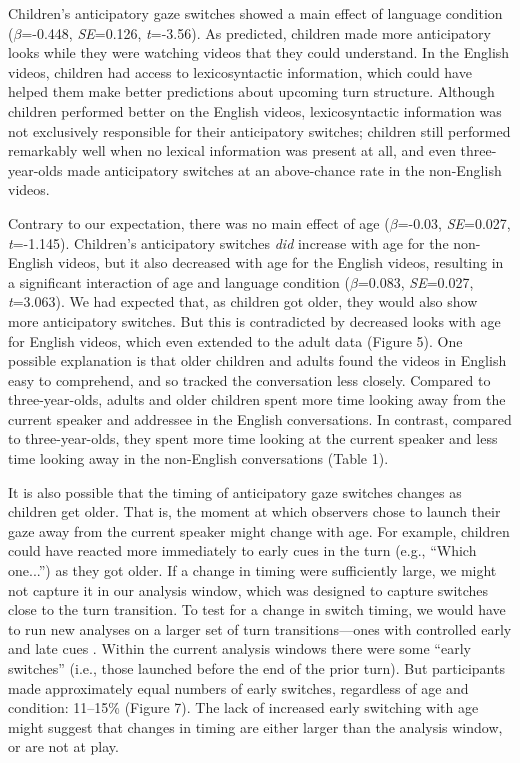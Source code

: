 \documentclass[authoryear, 12pt]{elsarticle}
\begin{document}
Children's anticipatory gaze switches showed a main effect of language condition (\textit{$\beta$}=-0.448, \textit{SE}=0.126, \textit{t}=-3.56). As predicted, children made more anticipatory looks while they were watching videos that they could understand. In the English videos, children had access to lexicosyntactic information, which could have helped them make better predictions about upcoming turn structure. Although children performed better on the English videos, lexicosyntactic information was not exclusively responsible for their anticipatory switches; children still performed remarkably well when no lexical information was present at all, and even three-year-olds made anticipatory switches at an above-chance rate in the non-English videos.

Contrary to our expectation, there was no main effect of age (\textit{$\beta$}=-0.03, \textit{SE}=0.027, \textit{t}=-1.145). Children's anticipatory switches \textit{did} increase with age for the non-English videos, but it also decreased with age for the English videos, resulting in a significant interaction of age and language condition (\textit{$\beta$}=0.083, \textit{SE}=0.027, \textit{t}=3.063). We had expected that, as children got older, they would also show more anticipatory switches. But this is contradicted by decreased looks with age for English videos, which even extended to the adult data (Figure 5). One possible explanation is that older children and adults found the videos in English easy to comprehend, and so tracked the conversation less closely. Compared to three-year-olds, adults and older children spent more time looking away from the current speaker and addressee in the English conversations. In contrast, compared to three-year-olds, they spent more time looking at the current speaker and less time looking away in the non-English conversations (Table 1).

It is also possible that the timing of anticipatory gaze switches changes as children get older. That is, the moment at which observers chose to launch their gaze away from the current speaker might change with age. For example, children could have reacted more immediately to early cues in the turn (e.g., ``Which one...'') as they got older. If a change in timing were sufficiently large, we might not capture it in our analysis window, which was designed to capture switches close to the turn transition. To test for a change in switch timing, we would have to run new analyses on a larger set of turn transitions---ones with controlled early and late cues \citep[see, e.g.,][]{bogelsmagyariInPrep}. Within the current analysis windows there were some ``early switches'' (i.e., those launched before the end of the prior turn). But participants made approximately equal numbers of early switches, regardless of age and condition: 11--15\% (Figure 7). The lack of increased early switching with age might suggest that changes in timing are either larger than the analysis window, or are not at play.
\end{document}
